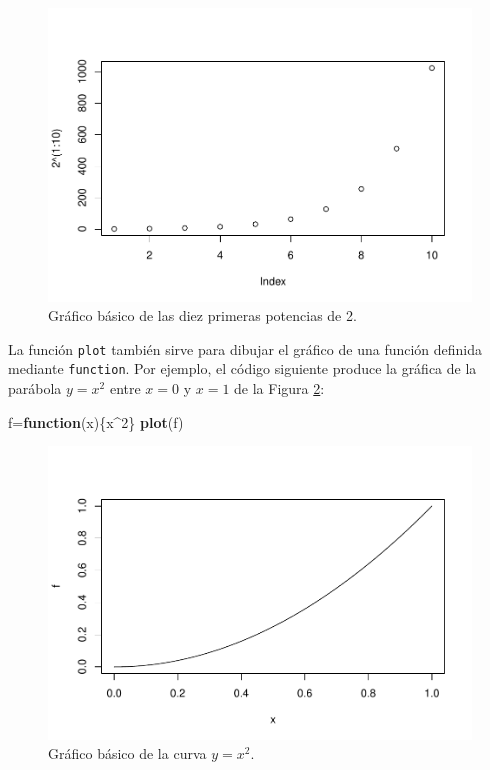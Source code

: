 \documentclass[
]{book}
\newenvironment{Shaded}{\begin{snugshade}}{\end{snugshade}}
\newcommand{\ControlFlowTok}[1]{\textcolor[rgb]{0.13,0.29,0.53}{\textbf{#1}}}
\newcommand{\DecValTok}[1]{\textcolor[rgb]{0.00,0.00,0.81}{#1}}
\newcommand{\KeywordTok}[1]{\textcolor[rgb]{0.13,0.29,0.53}{\textbf{#1}}}
\newcommand{\NormalTok}[1]{#1}
\newcommand{\OperatorTok}[1]{\textcolor[rgb]{0.81,0.36,0.00}{\textbf{#1}}}
\theoremstyle{definition}
\theoremstyle{definition}
\theoremstyle{definition}
\theoremstyle{remark}
\begin{document}
\begin{figure}

{\centering \includegraphics[width=0.9\linewidth]{07chap06_Graficos_I_files/figure-latex/F50105-1} 

}

\caption{Gráfico básico de las diez primeras potencias de 2.}\label{fig:F50105}
\end{figure}

La función \texttt{plot} también sirve para dibujar el gráfico de una función definida mediante \texttt{function}.
Por ejemplo, el código siguiente produce la gráfica de la parábola \(y=x^2\) entre \(x=0\) y \(x=1\) de la Figura \ref{fig:x2}:

\begin{Shaded}
\begin{Highlighting}[]
\NormalTok{f=}\ControlFlowTok{function}\NormalTok{(x)\{x}\OperatorTok{\^{}}\DecValTok{2}\NormalTok{\}}
\KeywordTok{plot}\NormalTok{(f)}
\end{Highlighting}
\end{Shaded}

\begin{figure}

{\centering \includegraphics[width=0.9\linewidth]{07chap06_Graficos_I_files/figure-latex/x2-1} 

}

\caption{Gráfico básico de la curva $y=x^2$.}\label{fig:x2}
\end{figure}
\end{document}
